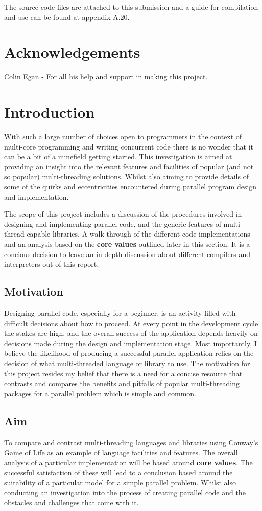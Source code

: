 \documentclass[11pt]{article} %
\begin{document}
The source code files are attached to this submission and a guide for compilation and use can be found at appendix A.20.
\pagebreak
\section{Acknowledgements}
Colin Egan - For all his help and support in making this project.
\pagebreak
\section{Introduction}
With such a large number of choices open to programmers in the context of multi-core programming and writing concurrent code there is no wonder that it can be a bit of a minefield getting started. This investigation is aimed at providing an insight into the relevant features and facilities of popular (and not so popular) multi-threading solutions. Whilst also aiming to provide details of some of the quirks and eccentricities encountered during parallel program design and implementation.

The scope of this project includes a discussion of the procedures involved in designing and implementing parallel code, and the generic features of multi-thread capable libraries. A walk-through of the different code implementations and an analysis based on the {\bf core values} outlined later in this section. It is a concious decision to leave an in-depth discussion about different compilers and interpreters out of this report.
\subsection{Motivation}
Designing parallel code, especially for a beginner, is an activity filled with difficult decisions about how to proceed. At every point in the development cycle the stakes are high, and the overall success of the application depends heavily on decisions made during the design and implementation stage. Most importantly, I believe the likelihood of producing a successful parallel application relies on the decision of what multi-threaded language or library to use. The motivation for this project resides my belief that there is a need for a concise resource that contrasts and compares the benefits and pitfalls of popular multi-threading packages for a parallel problem which is simple and common.
\subsection{Aim}
To compare and contrast multi-threading languages and libraries using Conway's Game of Life as an example of language facilities and features. The overall analysis of a particular implementation will be based around {\bf core values}. The successful satisfaction of these will lead to a conclusion based around the suitability of a particular model for a simple parallel problem. Whilst also conducting an investigation into the process of creating parallel code and the obstacles and challenges that come with it.
\end{document}
